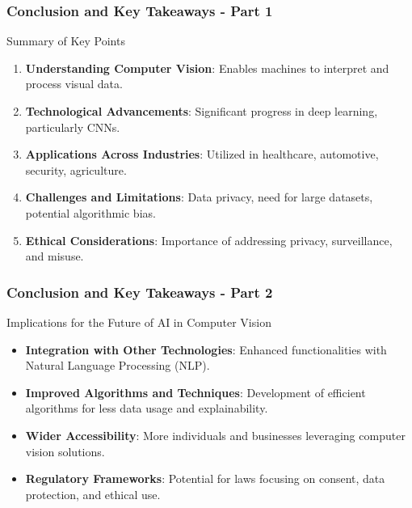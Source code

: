 \documentclass[aspectratio=169]{beamer}
\begin{document}
\begin{frame}[fragile]
    \frametitle{Conclusion and Key Takeaways - Part 1}
    \begin{block}{Summary of Key Points}
        \begin{enumerate}
            \item \textbf{Understanding Computer Vision}: Enables machines to interpret and process visual data.
            \item \textbf{Technological Advancements}: Significant progress in deep learning, particularly CNNs.
            \item \textbf{Applications Across Industries}: Utilized in healthcare, automotive, security, agriculture.
            \item \textbf{Challenges and Limitations}: Data privacy, need for large datasets, potential algorithmic bias.
            \item \textbf{Ethical Considerations}: Importance of addressing privacy, surveillance, and misuse.
        \end{enumerate}
    \end{block}
\end{frame}

\begin{frame}[fragile]
    \frametitle{Conclusion and Key Takeaways - Part 2}
    \begin{block}{Implications for the Future of AI in Computer Vision}
        \begin{itemize}
            \item \textbf{Integration with Other Technologies}: Enhanced functionalities with Natural Language Processing (NLP).
            \item \textbf{Improved Algorithms and Techniques}: Development of efficient algorithms for less data usage and explainability.
            \item \textbf{Wider Accessibility}: More individuals and businesses leveraging computer vision solutions.
            \item \textbf{Regulatory Frameworks}: Potential for laws focusing on consent, data protection, and ethical use.
        \end{itemize}
    \end{block}
\end{frame}
\end{document}
